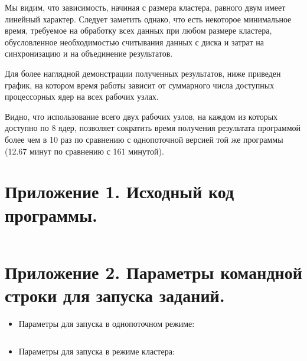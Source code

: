\documentclass[12pt,a4paper]{report}
\begin{document}
Мы видим, что зависимость, начиная с размера кластера, равного двум имеет линейный характер. Следует заметить однако, что есть некоторое минимальное время, требуемое на обработку всех данных при любом размере кластера, обусловленное необходимостью считывания данных с диска и затрат на синхронизацию и на объединение результатов.

Для более наглядной демонстрации полученных результатов, ниже приведен график, на котором время работы зависит от суммарного числа доступных процессорных ядер на всех рабочих узлах.
\begin{figure}[H]
\centering
\end{figure}

Видно, что использование всего двух рабочих узлов, на каждом из которых доступно по 8 ядер, позволяет сократить время получения результата программой более чем в 10 раз по сравнению с однопоточной версией той же программы (12.67 минут по сравнению с 161 минутой).

\newpage



\section{Приложение 1. Исходный код программы.}

\inputminted[fontsize=\footnotesize]{python}{../look_alike.py}

\section{Приложение 2. Параметры командной строки для запуска заданий.}

\begin{itemize}
\item Параметры для запуска в однопоточном режиме:
\inputminted[fontsize=\footnotesize]{text}{submit-local.txt}
\item Параметры для запуска в режиме кластера:
\inputminted[fontsize=\footnotesize]{text}{submit-cluster.txt}
\end{itemize}
\end{document}
